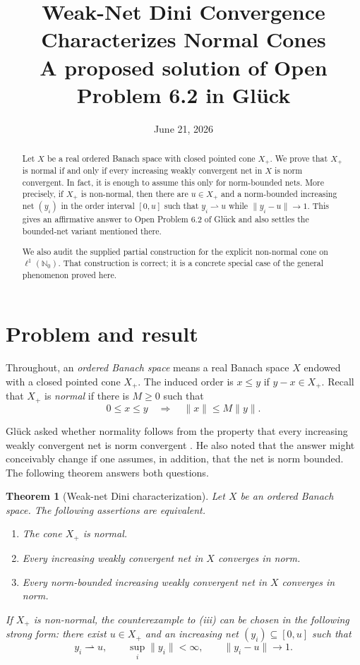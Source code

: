 \documentclass[11pt]{article}
\title{Weak-Net Dini Convergence Characterizes Normal Cones\\
\large A proposed solution of Open Problem 6.2 in Gl\"uck}
\author{}
\date{June 21, 2026}
\newtheorem{theorem}{Theorem}[section]
\theoremstyle{remark}
\newcommand{\norm}[1]{\lVert #1\rVert}
\begin{document}
\maketitle

\begin{abstract}
Let $X$ be a real ordered Banach space with closed pointed cone $X_+$.
We prove that $X_+$ is normal if and only if every increasing weakly
convergent net in $X$ is norm convergent.  In fact, it is enough to assume
this only for norm-bounded nets.  More precisely, if $X_+$ is non-normal,
then there are $u\in X_+$ and a norm-bounded increasing net $(y_i)$ in the
order interval $[0,u]$ such that $y_i\rightharpoonup u$ while
$\norm{y_i-u}\to 1$.  This gives an affirmative answer to Open Problem 6.2
of Gl\"uck and also settles the bounded-net variant mentioned there.

We also audit the supplied partial construction for the explicit non-normal
cone on $\ell^1(\mathbb N_0)$.  That construction is correct; it is a concrete
special case of the general phenomenon proved here.
\end{abstract}

\section{Problem and result}

Throughout, an \emph{ordered Banach space} means a real Banach space $X$
endowed with a closed pointed cone $X_+$.  The induced order is
$x\leq y$ if $y-x\in X_+$.  Recall that $X_+$ is \emph{normal} if there is
$M\geq 0$ such that
\[
  0\leq x\leq y \quad\Longrightarrow\quad \norm{x}\leq M\norm{y}.
\]

Gl\"uck asked whether normality follows from the property that every
increasing weakly convergent net is norm convergent
\cite[Open Problem~6.2]{Glueck2025}.  He also noted that the answer might
conceivably change if one assumes, in addition, that the net is norm
bounded.  The following theorem answers both questions.

\begin{theorem}[Weak-net Dini characterization]\label{thm:main}
Let $X$ be an ordered Banach space.  The following assertions are
equivalent.
\begin{enumerate}[label=\textup{(\roman*)}]
  \item The cone $X_+$ is normal.
  \item Every increasing weakly convergent net in $X$ converges in norm.
  \item Every norm-bounded increasing weakly convergent net in $X$
        converges in norm.
\end{enumerate}
If $X_+$ is non-normal, the counterexample to \textup{(iii)} can be chosen
in the following strong form: there exist $u\in X_+$ and an increasing net
$(y_i)\subseteq[0,u]$ such that
\[
  y_i\rightharpoonup u,
  \qquad
  \sup_i\norm{y_i}<\infty,
  \qquad
  \norm{y_i-u}\longrightarrow 1.
\]
\end{theorem}
\end{document}
